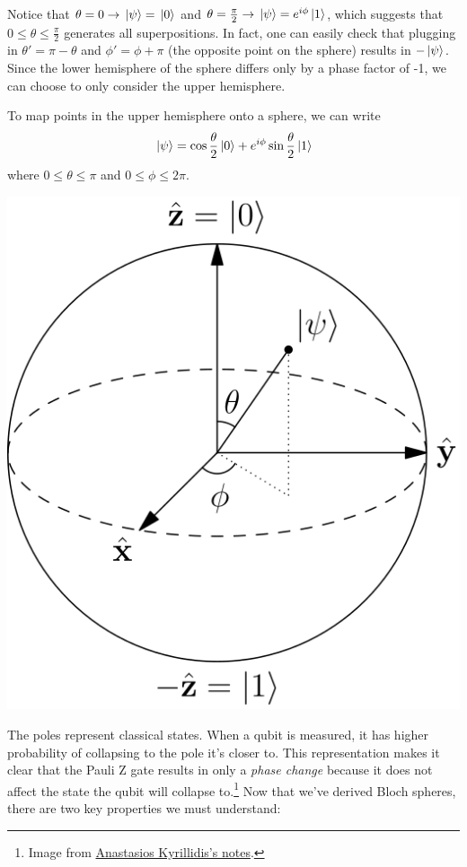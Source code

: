 Notice that $\theta =0 \rightarrow \ket*{\psi} = \ket*{0}$ and $\theta = \frac{\pi}{2} \rightarrow \ket*{\psi} = e^{i \phi} \ket*{1}$, which suggests that $0 \leq \theta \leq \frac{\pi}{2}$ generates all superpositions. In fact, one can easily check that plugging in $\theta' = \pi - \theta$ and $\phi' = \phi + \pi$ (the opposite point on the sphere) results in $-\ket*{\psi}$. Since the lower hemisphere of the sphere differs only by a phase factor of -1, we can choose to only consider the upper hemisphere. 

To map points in the upper hemisphere onto a sphere, we can write 
$$\ket*{\psi} = \cos \frac{\theta}{2} \ket*{0} + e^{i \phi} \sin \frac{\theta}{2} \ket*{1}$$
where $0 \leq \theta \leq \pi$ and $0 \leq \phi \leq 2\pi$. 

{
\centering \includegraphics[width=.3\linewidth]{ch1/bloch.png}\par }

The poles represent classical states. When a qubit is measured, it has higher probability of collapsing to the pole it's closer to. This representation makes it clear that the Pauli Z gate results in only a \textit{phase change} because it does not affect the state the qubit will collapse to.\footnote{Image from \href{http://akyrillidis.github.io/notes/quant_post_7}{Anastasios Kyrillidis's notes}.} Now that we've derived Bloch spheres, there are two key properties we must understand:

